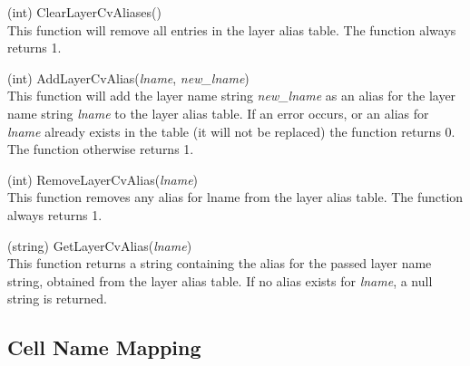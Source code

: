 \begin{description}
\item{(int) \vt ClearLayerCvAliases()}\\
This function will remove all entries in the layer alias table.
The function always returns 1.

\item{(int) \vt AddLayerCvAlias({\it lname\/}, {\it new\_lname\/})}\\
This function will add the layer name string {\it new\_lname} as an
alias for the layer name string {\it lname} to the layer alias table. 
If an error occurs, or an alias for {\it lname} already exists in the
table (it will not be replaced) the function returns 0.  The function
otherwise returns 1.

\item{(int) \vt RemoveLayerCvAlias({\it lname\/})}\\
This function removes any alias for {\vt lname} from the layer alias
table.  The function always returns 1.

\item{(string) \vt GetLayerCvAlias({\it lname\/})}\\
This function returns a string containing the alias for the passed
layer name string, obtained from the layer alias table.  If no alias
exists for {\it lname}, a null string is returned.

\end{description}


\subsection{Cell Name Mapping}

